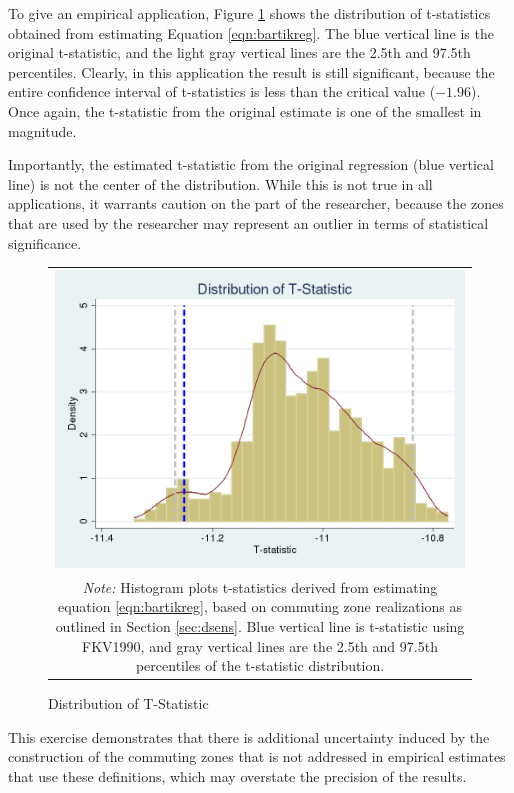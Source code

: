 To give an empirical application, Figure \ref{fig:1990_tdist} shows the distribution of t-statistics obtained from estimating Equation \ref{eqn:bartikreg}. The blue vertical line is the original t-statistic, and the light gray vertical lines are the 2.5th and 97.5th percentiles. Clearly, in this application the result is still significant, because the entire confidence interval of t-statistics is less than the critical value ($-1.96$). Once again, the t-statistic from the original estimate is one of the smallest in magnitude.

Importantly, the estimated t-statistic from the original regression (blue vertical line) is not the center of the distribution. While this is not true in all applications, it warrants caution on the part of the researcher, because the zones that are used by the researcher may represent an outlier in terms of statistical significance.

\begin{figure}\centering
\caption{Distribution of T-Statistic \label{fig:1990_tdist}}
\begin{tabular}{c}
\includegraphics[scale=.35]{./figures/tdistribution_bartik_moe_new.png}\\
\multicolumn{1}{p{4.5in}}{\footnotesize \emph{Note:} Histogram plots t-statistics derived from estimating  equation \ref{eqn:bartikreg}, based on commuting zone realizations as outlined in Section \ref{sec:dsens}. Blue vertical line is t-statistic using FKV1990, and gray vertical lines are the 2.5th and 97.5th percentiles of the t-statistic distribution.}
\end{tabular}
\end{figure}

This exercise demonstrates that there is additional uncertainty induced by the construction of the commuting zones that is not addressed in empirical estimates that use these definitions, which may overstate the precision of the results.





